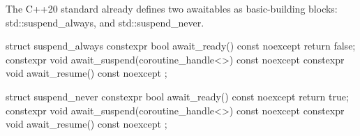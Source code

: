 The C++20 standard already defines two awaitables as basic-building blocks: std::suspend\_always, and std::suspend\_never.


\begin{cpp}
struct suspend_always {
	constexpr bool await_ready() const noexcept { return false; }
	constexpr void await_suspend(coroutine_handle<>) const noexcept {}
	constexpr void await_resume() const noexcept {}
};

struct suspend_never {
	constexpr bool await_ready() const noexcept { return true; }
	constexpr void await_suspend(coroutine_handle<>) const noexcept {}
	constexpr void await_resume() const noexcept {}
};
\end{cpp}












